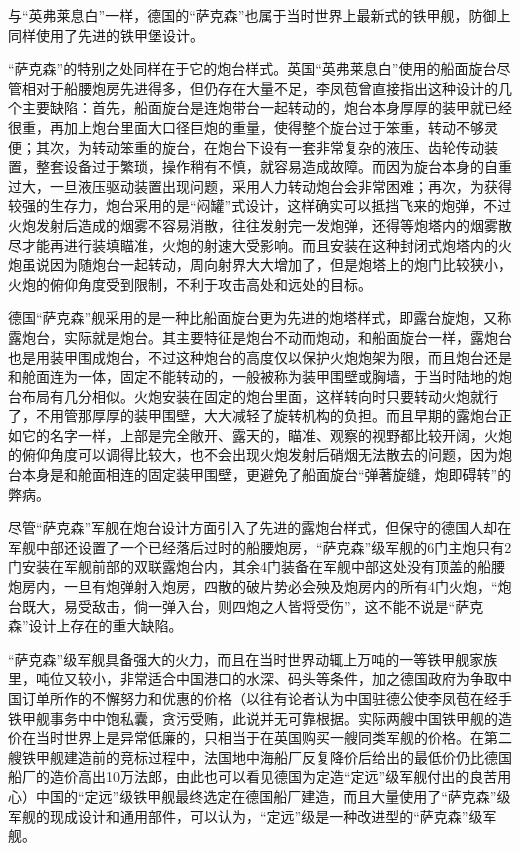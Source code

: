 \documentclass[12pt,UTF8]{ctexbook}
\begin{document}
与“英弗莱息白”一样，德国的“萨克森”也属于当时世界上最新式的铁甲舰，防御上同样使用了先进的铁甲堡设计。

“萨克森”的特别之处同样在于它的炮台样式。英国“英弗莱息白”使用的船面旋台尽管相对于船腰炮房先进得多，但仍存在大量不足，李凤苞曾直接指出这种设计的几个主要缺陷：首先，船面旋台是连炮带台一起转动的，炮台本身厚厚的装甲就已经很重，再加上炮台里面大口径巨炮的重量，使得整个旋台过于笨重，转动不够灵便；其次，为转动笨重的旋台，在炮台下设有一套非常复杂的液压、齿轮传动装置，整套设备过于繁琐，操作稍有不慎，就容易造成故障。而因为旋台本身的自重过大，一旦液压驱动装置出现问题，采用人力转动炮台会非常困难；再次，为获得较强的生存力，炮台采用的是“闷罐”式设计，这样确实可以抵挡飞来的炮弹，不过火炮发射后造成的烟雾不容易消散，往往发射完一发炮弹，还得等炮塔内的烟雾散尽才能再进行装填瞄准，火炮的射速大受影响。而且安装在这种封闭式炮塔内的火炮虽说因为随炮台一起转动，周向射界大大增加了，但是炮塔上的炮门比较狭小，火炮的俯仰角度受到限制，不利于攻击高处和远处的目标。

德国“萨克森”舰采用的是一种比船面旋台更为先进的炮塔样式，即露台旋炮，又称露炮台，实际就是炮台。其主要特征是炮台不动而炮动，和船面旋台一样，露炮台也是用装甲围成炮台，不过这种炮台的高度仅以保护火炮炮架为限，而且炮台还是和舱面连为一体，固定不能转动的，一般被称为装甲围壁或胸墙，于当时陆地的炮台布局有几分相似。火炮安装在固定的炮台里面，这样转向时只要转动火炮就行了，不用管那厚厚的装甲围壁，大大减轻了旋转机构的负担。而且早期的露炮台正如它的名字一样，上部是完全敞开、露天的，瞄准、观察的视野都比较开阔，火炮的俯仰角度可以调得比较大，也不会出现火炮发射后硝烟无法散去的问题，因为炮台本身是和舱面相连的固定装甲围壁，更避免了船面旋台“弹著旋缝，炮即碍转”的弊病。

尽管“萨克森”军舰在炮台设计方面引入了先进的露炮台样式，但保守的德国人却在军舰中部还设置了一个已经落后过时的船腰炮房，“萨克森”级军舰的6门主炮只有2门安装在军舰前部的双联露炮台内，其余4门装备在军舰中部这处没有顶盖的船腰炮房内，一旦有炮弹射入炮房，四散的破片势必会殃及炮房内的所有4门火炮，“炮台既大，易受敌击，倘一弹入台，则四炮之人皆将受伤”，这不能不说是“萨克森”设计上存在的重大缺陷。

“萨克森”级军舰具备强大的火力，而且在当时世界动辄上万吨的一等铁甲舰家族里，吨位又较小，非常适合中国港口的水深、码头等条件，加之德国政府为争取中国订单所作的不懈努力和优惠的价格（以往有论者认为中国驻德公使李凤苞在经手铁甲舰事务中中饱私囊，贪污受贿，此说并无可靠根据。实际两艘中国铁甲舰的造价在当时世界上是异常低廉的，只相当于在英国购买一艘同类军舰的价格。在第二艘铁甲舰建造前的竞标过程中，法国地中海船厂反复降价后给出的最低价仍比德国船厂的造价高出10万法郎，由此也可以看见德国为定造“定远”级军舰付出的良苦用心）中国的“定远”级铁甲舰最终选定在德国船厂建造，而且大量使用了“萨克森”级军舰的现成设计和通用部件，可以认为，“定远”级是一种改进型的“萨克森”级军舰。
\end{document}
